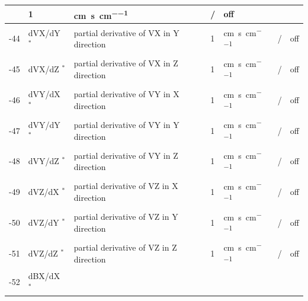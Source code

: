 \begin{landscape}
\begin{longtable}{|r|l|l|l|l|c|c|}
                           & 1                            & \si{\centi\metre\per\second\per\centi\metre}
			   & /              & off
    \\ \hline
    -44                    & dVX/dY $^*$
                           & partial derivative of VX in Y direction
                           & 1                            & \si{\centi\metre\per\second\per\centi\metre}
			   & /              & off
    \\ \hline
    -45                    & dVX/dZ $^*$
                           & partial derivative of VX in Z direction
                           & 1                            & \si{\centi\metre\per\second\per\centi\metre}
			   & /              & off
    \\ \hline
    -46                    & dVY/dX $^*$
                           & partial derivative of VY in X direction
                           & 1                            & \si{\centi\metre\per\second\per\centi\metre}
			   & /              & off
    \\ \hline
    -47                    & dVY/dY $^*$
                           & partial derivative of VY in Y direction
                           & 1                            & \si{\centi\metre\per\second\per\centi\metre}
			   & /              & off
    \\ \hline
    -48                    & dVY/dZ $^*$
                           & partial derivative of VY in Z direction
                           & 1                            & \si{\centi\metre\per\second\per\centi\metre}
			   & /              & off
    \\ \hline
    -49                    & dVZ/dX $^*$
                           & partial derivative of VZ in X direction
                           & 1                            & \si{\centi\metre\per\second\per\centi\metre}
			   & /              & off
    \\ \hline
    -50                    & dVZ/dY $^*$
                           & partial derivative of VZ in Y direction
                           & 1                            & \si{\centi\metre\per\second\per\centi\metre}
			   & /              & off
    \\ \hline
    -51                    & dVZ/dZ $^*$
                           & partial derivative of VZ in Z direction
                           & 1                            & \si{\centi\metre\per\second\per\centi\metre}
			   & /              & off
    \\ \hline
    -52                    & dBX/dX $^*$

\end{longtable}
\end{landscape}

